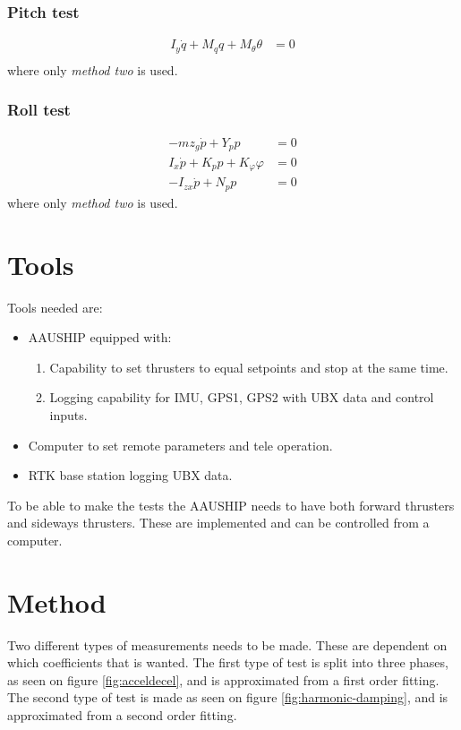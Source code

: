 \subsubsection{Pitch test}
\begin{align}
I_y\dot q + M_qq + M_\theta \theta&= 0\\
\end{align}
where only \textit{method two} is used.

\subsubsection{Roll test}
\begin{align}
-mz_g\dot p + Y_pp &= 0\\
I_x\dot p + K_pp + K_\varphi\varphi &= 0\\
-I_{zx}\dot p + N_pp &= 0
\end{align}
where only \textit{method two} is used.

\section{Tools}
Tools needed are:
\begin{itemize}
	\item AAUSHIP equipped with:
		\begin{enumerate}
			\item Capability to set thrusters to equal setpoints and stop at
			the same time.
			\item Logging capability for \ac{IMU}, GPS1, GPS2 with UBX data
				and control inputs.
		\end{enumerate}
	\item Computer to set remote parameters and tele operation.
	\item RTK base station logging UBX data.
\end{itemize}
To be able to make the tests the AAUSHIP needs to have both forward thrusters and sideways thrusters. These are implemented and can be controlled from a computer.

\section{Method}
Two different types of measurements needs to be made. These are dependent on which coefficients that is wanted. The first type of test is split into three phases, as seen on figure \ref{fig:acceldecel}, and is approximated from a first order fitting. The second type of test is made as seen on figure \ref{fig:harmonic-damping}, and is approximated from a second order fitting.

